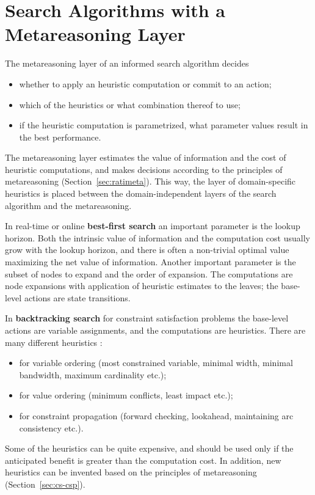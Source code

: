 \section{Search Algorithms
  with a Metareasoning Layer}

The metareasoning layer of an informed search algorithm decides
\begin{itemize}
\item whether to apply an heuristic computation or commit to an action;
\item which of the heuristics or what combination thereof to use;
\item if the heuristic computation is parametrized, what parameter values
  result in the best performance.
\end{itemize}
The metareasoning layer estimates the value of information and the
cost of heuristic computations, and makes decisions according to
the principles of metareasoning (Section~\ref{sec:ratimeta}). This
way, the layer of domain-specific heuristics is placed between the
domain-independent layers of the search algorithm and the
metareasoning.

In real-time or online {\bf best-first search} an important parameter
is the lookup horizon. Both the intrinsic value of information and the
computation cost usually grow with the lookup horizon, and there is
often a non-trivial optimal value maximizing the net value of
information. Another important parameter is the subset of nodes to
expand and the order of expansion. The computations are node
expansions with application of heuristic estimates to the leaves; the
base-level actions are state transitions.

In {\bf backtracking search} for constraint satisfaction problems
the base-level actions are variable assignments, and the computations are
heuristics.  There are many different heuristics \cite{Tsang.csp}:
\begin{itemize}
\item for variable ordering (most constrained variable, minimal width,
  minimal bandwidth, maximum cardinality etc.);
\item for value ordering (minimum conflicts, least impact etc.);
\item for constraint propagation (forward checking, lookahead, maintaining arc
  consistency etc.).
\end{itemize}
Some of the heuristics can be quite expensive, and should be used only
if the anticipated benefit is greater than the computation
cost. In addition, new heuristics can be invented based on the
principles of metareasoning (Section~\ref{sec:cs-csp}).

